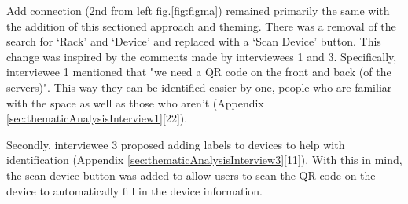 \documentclass [11pt,a4paper]{article}
\begin{document}
Add connection (2nd from left fig.\ref{fig:figma}) remained primarily the same with the addition of this sectioned approach and theming. There was a removal of the search for `Rack' and `Device' and replaced with a `Scan Device' button. This change was inspired by the comments made by interviewees 1 and 3. Specifically, interviewee 1 mentioned that "we need a QR code on the front and back (of the servers)". This way they can be identified easier by one, people who are familiar with the space as well as those who aren't (Appendix \ref{sec:thematicAnalysisInterview1}[22]). 

Secondly, interviewee 3 proposed adding labels to devices to help with identification (Appendix \ref{sec:thematicAnalysisInterview3}[11]). With this in mind, the scan device button was added to allow users to scan the QR code on the device to automatically fill in the device information. 
\end{document}
